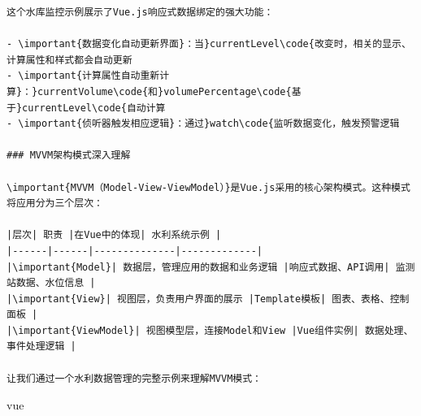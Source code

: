 \begin{lstlisting}
这个水库监控示例展示了Vue.js响应式数据绑定的强大功能：

- \important{数据变化自动更新界面}：当}currentLevel\code{改变时，相关的显示、计算属性和样式都会自动更新
- \important{计算属性自动重新计算}：}currentVolume\code{和}volumePercentage\code{基于}currentLevel\code{自动计算
- \important{侦听器触发相应逻辑}：通过}watch\code{监听数据变化，触发预警逻辑

### MVVM架构模式深入理解

\important{MVVM（Model-View-ViewModel）}是Vue.js采用的核心架构模式。这种模式将应用分为三个层次：

|层次| 职责 |在Vue中的体现| 水利系统示例 |
|------|------|--------------|-------------|
|\important{Model}| 数据层，管理应用的数据和业务逻辑 |响应式数据、API调用| 监测站数据、水位信息 |
|\important{View}| 视图层，负责用户界面的展示 |Template模板| 图表、表格、控制面板 |
|\important{ViewModel}| 视图模型层，连接Model和View |Vue组件实例| 数据处理、事件处理逻辑 |

让我们通过一个水利数据管理的完整示例来理解MVVM模式：

\end{lstlisting}

vue

